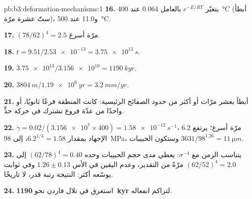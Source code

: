 \begin{solution}{pb:b3:deformation-mechanisms:1}
\textbf{16.} يتغيّر $e^{-E/RT}$ بالعامل 0.064 عند \qty{400}{\celsius}
(أبطأ ستّ عشرة مرّة)، و11.0 عند \qty{500}{\celsius}.

\textbf{17.} $(78/62)^4 = 2.5$ مرّة أسرع.

\textbf{18.} $t = 9.51/\num{2.53e-13} = \qty{3.75e13}{s}$.

\textbf{19.} $\num{3.75e13}/\num{3.156e10} = \qty{1190}{kyr}$.

\textbf{20.} $\qty{3804}{m}/\qty{1.19e6}{yr} = \qty{3.2}{mm/yr}$.

\textbf{21.} أبطأ بعشر مرّات أو أكثر من حدود الصفائح الرئيسية: كانت المنطقة
فرعًا ثانويًا، أو واحدًا من عدّة فروع تشترك في حركة حدٍّ.

\textbf{22.} $\dot\gamma = 0.02/(\num{3.156e7}\times400) = \qty{1.58e-12}{s^{-1}}$،
6.2 مرّة أسرع؛ يرتفع الإجهاد بمقدار $6.2^{1/4} = 1.58$، إلى \qty{98}{MPa}،
وستكون الحبيبات $3631/98^{1.26} = \qty{11}{\micro m}$.

\textbf{23.} يتناسب الزمن مع $\sigma^{-4}$: يعطي مدى حجم الحبيبات وحده
$(62/78)^4 = 0.40$ إلى $(62/52)^4 = 2.0$ مرّةً من التقدير،
وعدم اليقين في الأس $1.26 \pm 0.13$ وفي ثوابت 
يوسّعه أكثر: النتيجة رتبة قدر، لا تاريخًا.

\textbf{24.} استغرق  في تلال فاردن نحو
\textbf{\qty[text-series-to-math=true]{1190}{kyr}} لتراكم انفعاله.
\end{solution}
